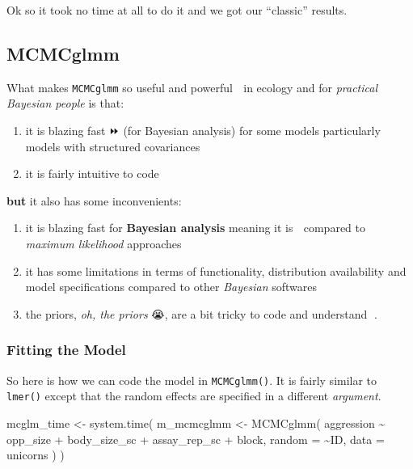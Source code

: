 \documentclass[
  12pt,
]{book}
\newenvironment{Shaded}{\begin{snugshade}}{\end{snugshade}}
\newcommand{\AttributeTok}[1]{\textcolor[rgb]{0.77,0.63,0.00}{#1}}
\newcommand{\FunctionTok}[1]{\textcolor[rgb]{0.00,0.00,0.00}{#1}}
\newcommand{\NormalTok}[1]{#1}
\newcommand{\OtherTok}[1]{\textcolor[rgb]{0.56,0.35,0.01}{#1}}
\newcommand{\SpecialCharTok}[1]{\textcolor[rgb]{0.00,0.00,0.00}{#1}}
\providecommand{\tightlist}{%
  \setlength{\itemsep}{0pt}\setlength{\parskip}{0pt}}
\begin{document}
Ok so it took no time at all to do it and we got our ``classic'' results.

\hypertarget{mcmcglmm}{%
\subsection{MCMCglmm}\label{mcmcglmm}}

What makes \texttt{MCMCglmm} so useful and powerful 💪 in ecology and for \emph{practical Bayesian people} is that:

\begin{enumerate}
\def\labelenumi{\arabic{enumi}.}
\tightlist
\item
  it is blazing fast ⏩ (for Bayesian analysis) for some models particularly models with structured covariances
\item
  it is fairly intuitive to code
\end{enumerate}

\textbf{but} it also has some inconvenients:

\begin{enumerate}
\def\labelenumi{\arabic{enumi}.}
\tightlist
\item
  it is blazing fast for \textbf{Bayesian analysis} meaning it is 🐌 compared to \emph{maximum likelihood} approaches
\item
  it has some limitations in terms of functionality, distribution availability and model specifications compared to other \emph{Bayesian} softwares
\item
  the priors, \emph{oh, the priors} 😭, are a bit tricky to code and understand 🤯.
\end{enumerate}

\hypertarget{fitting-the-model}{%
\subsubsection{Fitting the Model}\label{fitting-the-model}}

So here is how we can code the model in \texttt{MCMCglmm()}. It is fairly similar to \texttt{lmer()} except that the random effects are specified in a different \emph{argument}.

\begin{Shaded}
\begin{Highlighting}[]
\NormalTok{mcglm\_time }\OtherTok{\textless{}{-}} \FunctionTok{system.time}\NormalTok{(}
\NormalTok{  m\_mcmcglmm }\OtherTok{\textless{}{-}} \FunctionTok{MCMCglmm}\NormalTok{(}
\NormalTok{    aggression }\SpecialCharTok{\textasciitilde{}}\NormalTok{ opp\_size }\SpecialCharTok{+}\NormalTok{ body\_size\_sc }\SpecialCharTok{+}\NormalTok{ assay\_rep\_sc }\SpecialCharTok{+}\NormalTok{ block,}
    \AttributeTok{random =} \SpecialCharTok{\textasciitilde{}}\NormalTok{ID,}
    \AttributeTok{data =}\NormalTok{ unicorns}
\NormalTok{  )}
\NormalTok{)}
\end{Highlighting}
\end{Shaded}
\end{document}
